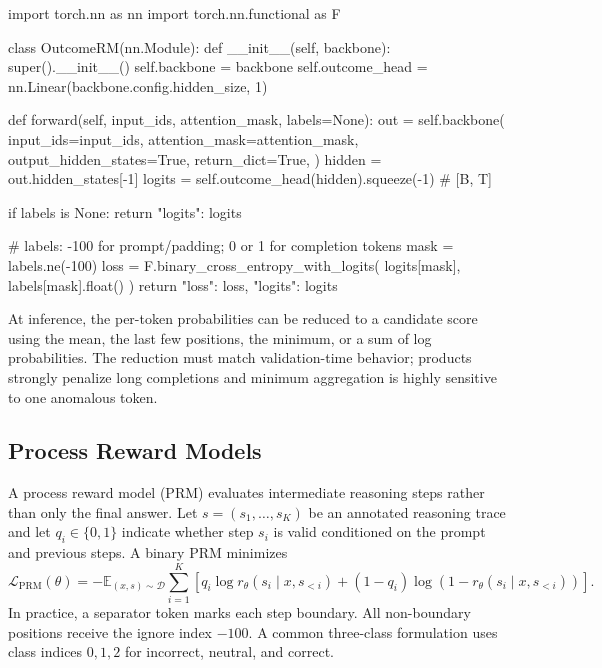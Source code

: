 \begin{codeblock}[language=Python,caption={Per-token outcome reward model.}]
import torch.nn as nn
import torch.nn.functional as F

class OutcomeRM(nn.Module):
    def __init__(self, backbone):
        super().__init__()
        self.backbone = backbone
        self.outcome_head = nn.Linear(backbone.config.hidden_size, 1)

    def forward(self, input_ids, attention_mask, labels=None):
        out = self.backbone(
            input_ids=input_ids,
            attention_mask=attention_mask,
            output_hidden_states=True,
            return_dict=True,
        )
        hidden = out.hidden_states[-1]
        logits = self.outcome_head(hidden).squeeze(-1)  # [B, T]

        if labels is None:
            return {"logits": logits}

        # labels: -100 for prompt/padding; 0 or 1 for completion tokens
        mask = labels.ne(-100)
        loss = F.binary_cross_entropy_with_logits(
            logits[mask], labels[mask].float()
        )
        return {"loss": loss, "logits": logits}
\end{codeblock}

At inference, the per-token probabilities can be reduced to a candidate score
using the mean, the last few positions, the minimum, or a sum of log
probabilities.  The reduction must match validation-time behavior; products
strongly penalize long completions and minimum aggregation is highly sensitive
to one anomalous token.

\subsection{Process Reward Models}

A process reward model (PRM) evaluates intermediate reasoning steps rather than
only the final answer.  Let
$s=(s_1,\ldots,s_K)$ be an annotated reasoning trace and let
$q_i\in\{0,1\}$ indicate whether step $s_i$ is valid conditioned on the prompt
and previous steps.  A binary PRM minimizes
\begin{equation}
    \mathcal{L}_{\mathrm{PRM}}(\theta)
    =
    -\mathbb{E}_{(x,s)\sim\mathcal{D}}
    \sum_{i=1}^{K}
    \left[
        q_i\log r_\theta(s_i\mid x,s_{<i})
        +(1-q_i)\log\!\left(1-r_\theta(s_i\mid x,s_{<i})\right)
    \right].
    \label{eq:prm-loss}
\end{equation}
In practice, a separator token marks each step boundary.  All non-boundary
positions receive the ignore index $-100$.  A common three-class formulation
uses class indices $0,1,2$ for incorrect, neutral, and correct.

